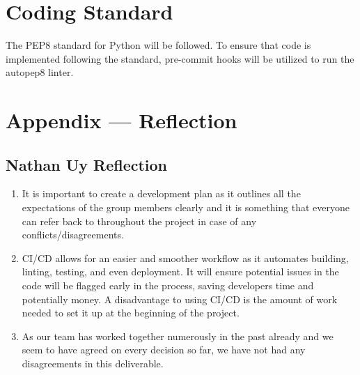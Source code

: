\documentclass{article}
\begin{document}
\section{Coding Standard}

The PEP8 standard for Python will be followed. To ensure that code is implemented following the standard, pre-commit hooks will be utilized to run the autopep8 linter.

\newpage{}

\section*{Appendix --- Reflection}

\subsection*{Nathan Uy Reflection}
\begin{enumerate}
    \item It is important to create a development plan as it outlines all the expectations of the group members clearly and it is something that everyone can refer back to throughout the project in case of any conflicts/disagreements.
    \item CI/CD allows for an easier and smoother workflow as it automates building, linting, testing, and even deployment. It will ensure potential issues in the code will be flagged early in the process, saving developers time and potentially money. A disadvantage to using CI/CD is the amount of work needed to set it up at the beginning of the project.
    \item As our team has worked together numerously in the past already and we seem to have agreed on every decision so far, we have not had any disagreements in this deliverable.
\end{enumerate}
\end{document}
